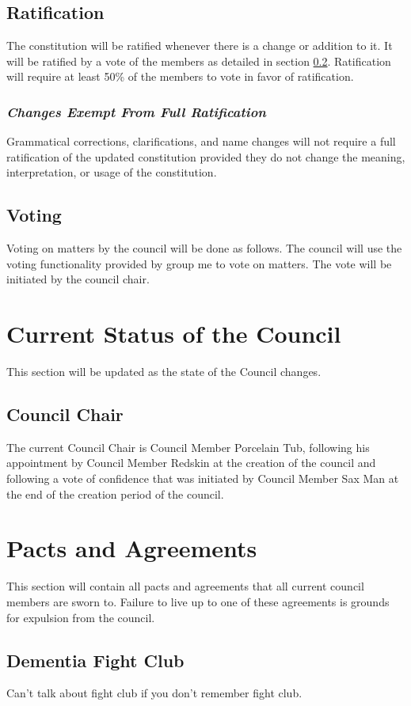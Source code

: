 \documentclass[]{article}
\begin{document}
\subsection{Ratification}
The constitution will be ratified whenever there is a change or addition to it. It will be ratified by a vote of the members as detailed in section \ref{subsec:voting}. Ratification will require at least 50\% of the members to vote in favor of ratification.
\subsubsection{\textit{Changes Exempt From Full Ratification}}
Grammatical corrections, clarifications, and name changes will not require a full ratification of the updated constitution provided they do not change the meaning, interpretation, or usage of the constitution.

\subsection{Voting}
\label{subsec:voting}
Voting on matters by the council will be done as follows. The council will use the voting functionality provided by group me to vote on matters. The vote will be initiated by the council chair.
\newpage
\section{Current Status of the Council}
\label{sec:status}
This section will be updated as the state of the Council changes.

\subsection{Council Chair}
The current Council Chair is Council Member Porcelain Tub, following his appointment by Council Member Redskin at the creation of the council and following a vote of confidence that was initiated by Council Member Sax Man at the end of the creation period of the council.

\section{Pacts and Agreements}
\label{sec:pacts}
This section will contain all pacts and agreements that all current council members are sworn to.
Failure to live up to one of these agreements is grounds for expulsion from the council.

\subsection{Dementia Fight Club}
\label{subsec:pacts:dementia}
Can't talk about fight club if you don't remember fight club.
\end{document}
